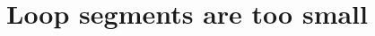\section{Loop segments are too small}
\label{section:node-level:loop-segments-too-small}









% 
% 
% 
% 
% 

